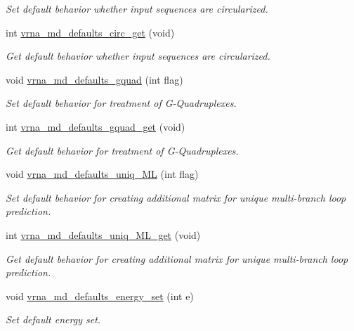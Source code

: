 \begin{DoxyCompactItemize}
\begin{DoxyCompactList}\small\item\em Set default behavior whether input sequences are circularized. \end{DoxyCompactList}\item 
int \hyperlink{group__model__details_gad3a7e58de344ad93a08925f58f94f6fb}{vrna\+\_\+md\+\_\+defaults\+\_\+circ\+\_\+get} (void)
\begin{DoxyCompactList}\small\item\em Get default behavior whether input sequences are circularized. \end{DoxyCompactList}\item 
void \hyperlink{group__model__details_ga0685ca2aeb39af76f2421fc308163dce}{vrna\+\_\+md\+\_\+defaults\+\_\+gquad} (int flag)
\begin{DoxyCompactList}\small\item\em Set default behavior for treatment of G-\/\+Quadruplexes. \end{DoxyCompactList}\item 
int \hyperlink{group__model__details_gae645b8612f879eb38b45244fa9eddb9e}{vrna\+\_\+md\+\_\+defaults\+\_\+gquad\+\_\+get} (void)
\begin{DoxyCompactList}\small\item\em Get default behavior for treatment of G-\/\+Quadruplexes. \end{DoxyCompactList}\item 
void \hyperlink{group__model__details_ga59b944f61c5d2babec2d4c48c820de67}{vrna\+\_\+md\+\_\+defaults\+\_\+uniq\+\_\+\+ML} (int flag)
\begin{DoxyCompactList}\small\item\em Set default behavior for creating additional matrix for unique multi-\/branch loop prediction. \end{DoxyCompactList}\item 
int \hyperlink{group__model__details_gab48e70fd024bf838404bcbcca0c874a0}{vrna\+\_\+md\+\_\+defaults\+\_\+uniq\+\_\+\+M\+L\+\_\+get} (void)
\begin{DoxyCompactList}\small\item\em Get default behavior for creating additional matrix for unique multi-\/branch loop prediction. \end{DoxyCompactList}\item 
void \hyperlink{group__model__details_ga8dd29c55787a4576277e1907e92d810c}{vrna\+\_\+md\+\_\+defaults\+\_\+energy\+\_\+set} (int e)
\begin{DoxyCompactList}\small\item\em Set default energy set. \end{DoxyCompactList}\item 

\end{DoxyCompactItemize}
